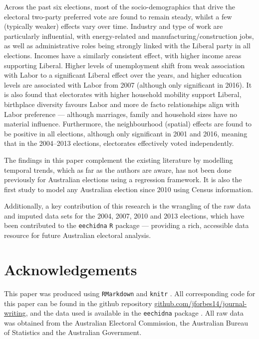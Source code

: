 \documentclass[11pt,a4paper,]{article}
\begin{document}
Across the past six elections, most of the socio-demographics that drive the electoral two-party preferred vote are found to remain steady, whilst a few (typically weaker) effects vary over time. Industry and type of work are particularly influential, with energy-related and manufacturing/construction jobs, as well as administrative roles being strongly linked with the Liberal party in all elections. Incomes have a similarly consistent effect, with higher income areas supporting Liberal. Higher levels of unemployment shift from weak association with Labor to a significant Liberal effect over the years, and higher education levels are associated with Labor from 2007 (although only significant in 2016). It is also found that electorates with higher household mobility support Liberal, birthplace diversity favours Labor and more de facto relationships align with Labor preference --- although marriages, family and household sizes have no material influence. Furthermore, the neighbourhood (spatial) effects are found to be positive in all elections, although only significant in 2001 and 2016, meaning that in the 2004--2013 elections, electorates effectively voted independently.

The findings in this paper complement the existing literature by modelling temporal trends, which as far as the authors are aware, has not been done previously for Australian elections using a regression framework. It is also the first study to model any Australian election since 2010 using Census information.

Additionally, a key contribution of this research is the wrangling of the raw data and imputed data sets for the 2004, 2007, 2010 and 2013 elections, which have been contributed to the \texttt{eechidna} \texttt{R} package --- providing a rich, accessible data resource for future Australian electoral analysis.

\hypertarget{acknowledgements}{%
\section{Acknowledgements}\label{acknowledgements}}

This paper was produced using \texttt{RMarkdown} \autocite{rmarkdown} and \texttt{knitr} \autocite{knitr}. All corresponding code for this paper can be found in the github repository \href{https://github.com/jforbes14/journal-writing}{github.com/jforbes14/journal-writing}, and the data used is available in the \texttt{eechidna} package \autocite{eechidna}. All raw data was obtained from the Australian Electoral Commission, the Australian Bureau of Statistics and the Australian Government.
\end{document}

